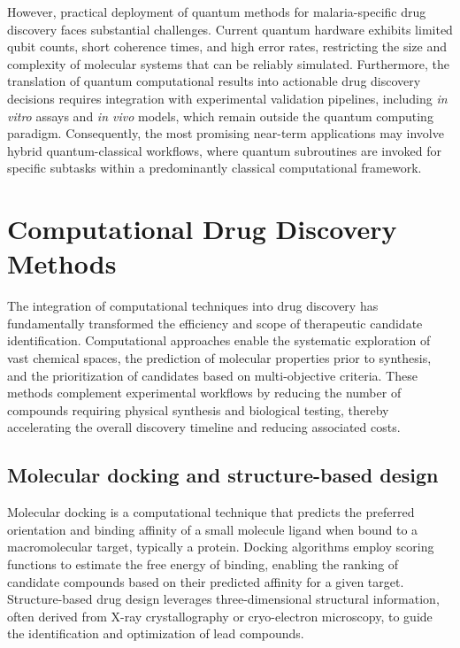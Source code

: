 However, practical deployment of quantum methods for malaria-specific drug discovery faces substantial challenges. Current quantum hardware exhibits limited qubit counts, short coherence times, and high error rates, restricting the size and complexity of molecular systems that can be reliably simulated. Furthermore, the translation of quantum computational results into actionable drug discovery decisions requires integration with experimental validation pipelines, including \emph{in vitro} assays and \emph{in vivo} models, which remain outside the quantum computing paradigm. Consequently, the most promising near-term applications may involve hybrid quantum-classical workflows, where quantum subroutines are invoked for specific subtasks within a predominantly classical computational framework.

\section{Computational Drug Discovery Methods}

The integration of computational techniques into drug discovery has fundamentally transformed the efficiency and scope of therapeutic candidate identification. Computational approaches enable the systematic exploration of vast chemical spaces, the prediction of molecular properties prior to synthesis, and the prioritization of candidates based on multi-objective criteria. These methods complement experimental workflows by reducing the number of compounds requiring physical synthesis and biological testing, thereby accelerating the overall discovery timeline and reducing associated costs.

\subsection{Molecular docking and structure-based design}

Molecular docking is a computational technique that predicts the preferred orientation and binding affinity of a small molecule ligand when bound to a macromolecular target, typically a protein. Docking algorithms employ scoring functions to estimate the free energy of binding, enabling the ranking of candidate compounds based on their predicted affinity for a given target. Structure-based drug design leverages three-dimensional structural information, often derived from X-ray crystallography or cryo-electron microscopy, to guide the identification and optimization of lead compounds.

